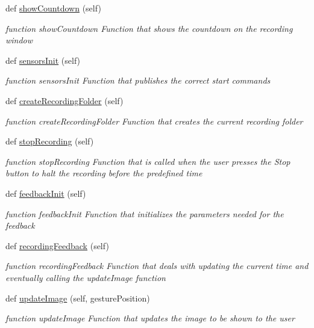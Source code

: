 \begin{DoxyCompactItemize}
def \hyperlink{classGUI__node_1_1MainWindow_a67334f3548f8ff20e391d5d4840e4794}{show\+Countdown} (self)
\begin{DoxyCompactList}\small\item\em function show\+Countdown Function that shows the countdown on the recording window \end{DoxyCompactList}\item 
def \hyperlink{classGUI__node_1_1MainWindow_af3f78981958f0ec8a6b073f64a6a08c2}{sensors\+Init} (self)
\begin{DoxyCompactList}\small\item\em function sensors\+Init Function that publishes the correct start commands \end{DoxyCompactList}\item 
def \hyperlink{classGUI__node_1_1MainWindow_a3e94c0d07b7df8ac9e665ef001c5bd31}{create\+Recording\+Folder} (self)
\begin{DoxyCompactList}\small\item\em function create\+Recording\+Folder Function that creates the current recording folder \end{DoxyCompactList}\item 
def \hyperlink{classGUI__node_1_1MainWindow_acddcf8f2932ff86fc1ad189cf60ab720}{stop\+Recording} (self)
\begin{DoxyCompactList}\small\item\em function stop\+Recording Function that is called when the user presses the Stop button to halt the recording before the predefined time \end{DoxyCompactList}\item 
def \hyperlink{classGUI__node_1_1MainWindow_a1877e3df74eea96aba726dbe547987c8}{feedback\+Init} (self)
\begin{DoxyCompactList}\small\item\em function feedback\+Init Function that initializes the parameters needed for the feedback \end{DoxyCompactList}\item 
def \hyperlink{classGUI__node_1_1MainWindow_aadfd391d5efa53cbd6eee41968972bfe}{recording\+Feedback} (self)
\begin{DoxyCompactList}\small\item\em function recording\+Feedback Function that deals with updating the current time and eventually calling the update\+Image function \end{DoxyCompactList}\item 
def \hyperlink{classGUI__node_1_1MainWindow_ab6b0d212b93f190da018162d8374aa80}{update\+Image} (self, gesture\+Position)
\begin{DoxyCompactList}\small\item\em function update\+Image Function that updates the image to be shown to the user \end{DoxyCompactList}\end{DoxyCompactItemize}
